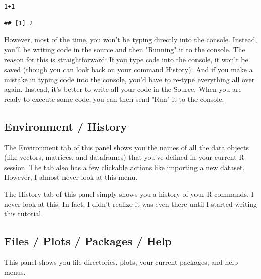 \documentclass{tufte-book}\usepackage[]{graphicx}\usepackage[]{color}
\makeatletter
\newcommand{\hlnum}[1]{\textcolor[rgb]{0.686,0.059,0.569}{#1}}%
\newcommand{\hlopt}[1]{\textcolor[rgb]{0,0,0}{#1}}%
\newenvironment{kframe}{%
 \def\at@end@of@kframe{}%
 \ifinner\ifhmode%
  \def\at@end@of@kframe{\end{minipage}}%
  \begin{minipage}{\columnwidth}%
 \fi\fi%
 \def\FrameCommand##1{\hskip\@totalleftmargin \hskip-\fboxsep
 \colorbox{shadecolor}{##1}\hskip-\fboxsep
     \hskip-\linewidth \hskip-\@totalleftmargin \hskip\columnwidth}%
 \MakeFramed {\advance\hsize-\width
   \@totalleftmargin\z@ \linewidth\hsize
   \@setminipage}}%
 {\par\unskip\endMakeFramed%
 \at@end@of@kframe}
\newenvironment{knitrout}{}{} %
\makeatother
\begin{document}
\begin{footnotesize}
\begin{knitrout}
\color{fgcolor}\begin{kframe}
\begin{alltt}
\hlnum{1}\hlopt{+}\hlnum{1}
\end{alltt}
\begin{verbatim}
## [1] 2
\end{verbatim}
\end{kframe}
\end{knitrout}
\end{footnotesize}


However, most of the time, you won't be typing directly into the console. Instead, you'll be writing code in the source and then "Running" it to the console. The reason for this is straightforward: If you type code into the console, it won't be saved (though you can look back on your command History). And if you make a mistake in typing code into the console, you'd have to re-type everything all over again. Instead, it's better to write all your code in the Source. When you are ready to execute some code, you can then send "Run" it to the console.

\subsection{Environment / History}

The Environment tab of this panel shows you the names of all the data objects (like vectors, matrices, and dataframes) that you've defined in your current R session. The tab also has a few clickable actions like importing a new dataset. However, I almost never look at this menu.

The History tab of this panel simply shows you a history of your R commands. I never look at this. In fact, I didn't realize it was even there until I started writing this tutorial.

\subsection{Files / Plots / Packages / Help}

This panel shows you file directories, plots, your current packages, and help menus.
\end{document}
